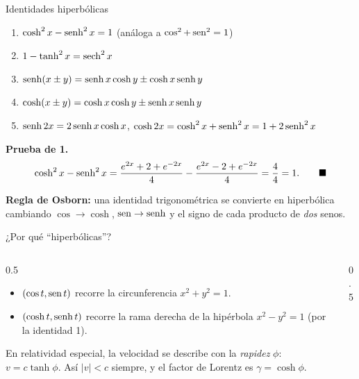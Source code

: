 \documentclass[10pt,aspectratio=169]{beamer}
\begin{document}
\begin{frame}{Identidades hiperbólicas}
  \begin{proposicion}
    \begin{enumerate}
      \item $\cosh^2x-\operatorname{senh}^2x=1$ \qquad (análoga a $\cos^2+\operatorname{sen}^2=1$)
      \item $1-\tanh^2x=\operatorname{sech}^2x$
      \item $\operatorname{senh}(x\pm y)=\operatorname{senh} x\cosh y\pm\cosh x\operatorname{senh} y$
      \item $\cosh(x\pm y)=\cosh x\cosh y\pm\operatorname{senh} x\operatorname{senh} y$
      \item $\operatorname{senh}2x=2\operatorname{senh} x\cosh x$, \quad $\cosh2x=\cosh^2x+\operatorname{senh}^2x=1+2\operatorname{senh}^2x$
    \end{enumerate}
  \end{proposicion}
  \textbf{Prueba de 1.}
  \[ \cosh^2x-\operatorname{senh}^2x=\frac{e^{2x}+2+e^{-2x}}{4}-\frac{e^{2x}-2+e^{-2x}}{4}=\frac44=1.\qquad\blacksquare \]
  \begin{idea}
    \textbf{Regla de Osborn:} una identidad trigonométrica se convierte en hiperbólica cambiando $\cos\to\cosh$, $\operatorname{sen}\to\operatorname{senh}$
    y el signo de cada producto de \emph{dos} senos.
  \end{idea}
\end{frame}

\begin{frame}{¿Por qué ``hiperbólicas''?}
  \begin{columns}
    \begin{column}{0.5\textwidth}
      \begin{itemize}
        \item $(\cos t,\operatorname{sen} t)$ recorre la circunferencia $x^2+y^2=1$.
        \item $(\cosh t,\operatorname{senh} t)$ recorre la rama derecha de la hipérbola $x^2-y^2=1$ (por la identidad 1).
      \end{itemize}
      \begin{ejemplo}[física]
        En relatividad especial, la velocidad se describe con la \emph{rapidez} $\phi$: $v=c\tanh\phi$. Así $|v|<c$ siempre,
        y el factor de Lorentz es $\gamma=\cosh\phi$.
      \end{ejemplo}
    \end{column}
    \begin{column}{0.5\textwidth}
      \centering
    \end{column}
  \end{columns}
\end{frame}
\end{document}
